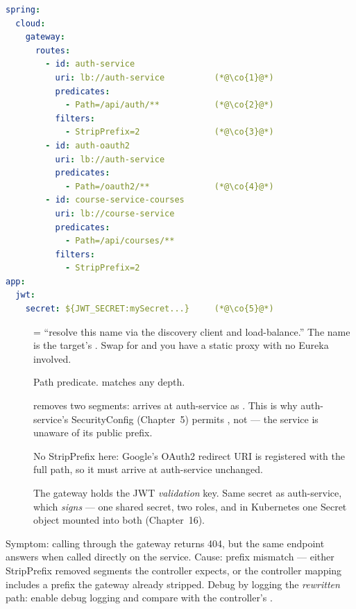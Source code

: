 \begin{lstlisting}[language=yaml]
spring:
  cloud:
    gateway:
      routes:
        - id: auth-service
          uri: lb://auth-service          (*@\co{1}@*)
          predicates:
            - Path=/api/auth/**           (*@\co{2}@*)
          filters:
            - StripPrefix=2               (*@\co{3}@*)
        - id: auth-oauth2
          uri: lb://auth-service
          predicates:
            - Path=/oauth2/**             (*@\co{4}@*)
        - id: course-service-courses
          uri: lb://course-service
          predicates:
            - Path=/api/courses/**
          filters:
            - StripPrefix=2
app:
  jwt:
    secret: ${JWT_SECRET:mySecret...}     (*@\co{5}@*)
\end{lstlisting}

\begin{description}
  \item[]  = ``resolve this name via the discovery
  client and load-balance.'' The name is the target's
  . Swap  for 
  and you have a static proxy with no Eureka involved.
  \item[] Path predicate. \code{**} matches any depth.
  \item[]  removes two segments:
   arrives at auth-service as .
  This is why auth-service's SecurityConfig (Chapter~5) permits
  , not  --- the service is unaware of
  its public prefix.
  \item[] No StripPrefix here: Google's OAuth2 redirect URI is
  registered with the full path, so it must arrive at auth-service
  unchanged.
  \item[] The gateway holds the JWT \emph{validation} key. Same
  secret as auth-service, which \emph{signs} --- one shared secret, two
  roles, and in Kubernetes one Secret object mounted into both
  (Chapter~16).
\end{description}

\begin{pitfall}
Symptom: calling  through the gateway returns
404, but the same endpoint answers when called directly on the service.
Cause: prefix mismatch --- either StripPrefix removed segments the
controller expects, or the controller mapping includes a prefix the
gateway already stripped. Debug by logging the \emph{rewritten} path:
enable  debug logging and compare with the
controller's .
\end{pitfall}

